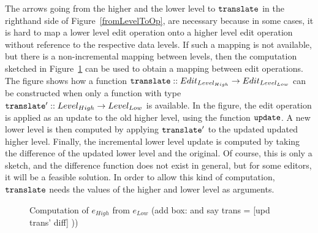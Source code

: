 The arrows going from the higher and the lower level to ${\tt translate}$ in the righthand side of Figure~\ref{fromLevelToOp}, are necessary because in some cases, it is hard to map a lower level edit operation onto a higher level edit operation without reference to the respective data levels. If such a mapping is not available, but there is a non-incremental mapping between levels, then the computation sketched in Figure~\ref{computeOps} can be used to obtain a mapping between edit operations. The figure shows how a function ${\tt translate} :: Edit_{Level_{High}} \rightarrow Edit_{Level_{Low}}$ can be constructed when only a function with type ${\tt translate'} :: Level_{High} \rightarrow Level_{Low}$  is available. In the figure, the edit operation is applied as an update to the old higher level, using the function ${\tt update}$. A new lower level is then computed by applying ${\tt translate'}$ to the updated updated higher level. Finally, the incremental lower level update is computed by taking the difference of the updated lower level and the original. Of course, this is only a sketch, and the difference function does not exist in general, but for some editors, it will be a feasible solution. In order to allow this kind of computation, ${\tt translate}$ needs the values of the higher and lower level as arguments.

\begin{figure}
\begin{small}
\begin{center}
\begin{center}
\begin{small}
\bigskip \noindent
{}
\end{small}
\end{center}\caption{Computation of $e_{High}$ from $e_{Low}$ (add box: and say trans = [upd trans' diff] )) }\label{computeOps} 
\end{center}
\end{small}
\end{figure}


